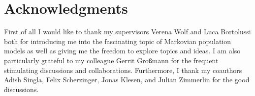 



\vspace{3cm}

\begingroup
\let\clearpage\relax
\let\cleardoublepage\relax
\let\cleardoublepage\relax
\chapter*{Acknowledgments}
First of all I would like to thank my supervisors Verena Wolf and Luca Bortolussi both for introducing me into the fascinating topic of Markovian population models as well as giving me the freedom to explore topics and ideas.
I am also particularly grateful to my colleague Gerrit Großmann for the frequent stimulating discussions and collaborations.
Furthermore, I thank my coauthors Adish Singla, Felix Scherzinger, Jonas Klesen, and Julian Zimmerlin for the good discussions.



\endgroup
